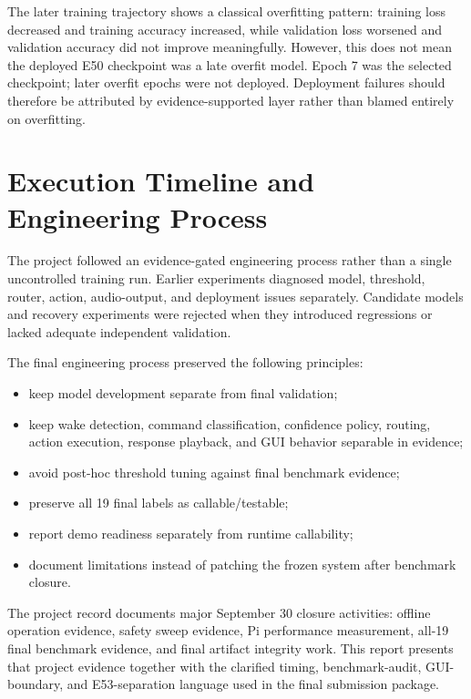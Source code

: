 \documentclass[11pt]{article}
\begin{document}
The later training trajectory shows a classical overfitting pattern: training loss decreased and training accuracy increased, while validation loss worsened and validation accuracy did not improve meaningfully. However, this does not mean the deployed E50 checkpoint was a late overfit model. Epoch 7 was the selected checkpoint; later overfit epochs were not deployed. Deployment failures should therefore be attributed by evidence-supported layer rather than blamed entirely on overfitting.

\section{Execution Timeline and Engineering Process}

The project followed an evidence-gated engineering process rather than a single uncontrolled training run. Earlier experiments diagnosed model, threshold, router, action, audio-output, and deployment issues separately. Candidate models and recovery experiments were rejected when they introduced regressions or lacked adequate independent validation.

The final engineering process preserved the following principles:

\begin{itemize}
\item keep model development separate from final validation;
\item keep wake detection, command classification, confidence policy, routing, action execution, response playback, and GUI behavior separable in evidence;
\item avoid post-hoc threshold tuning against final benchmark evidence;
\item preserve all 19 final labels as callable/testable;
\item report demo readiness separately from runtime callability;
\item document limitations instead of patching the frozen system after benchmark closure.
\end{itemize}

The project record documents major September 30 closure activities: offline operation evidence, safety sweep evidence, Pi performance measurement, all-19 final benchmark evidence, and final artifact integrity work. This report presents that project evidence together with the clarified timing, benchmark-audit, GUI-boundary, and E53-separation language used in the final submission package.
\end{document}
